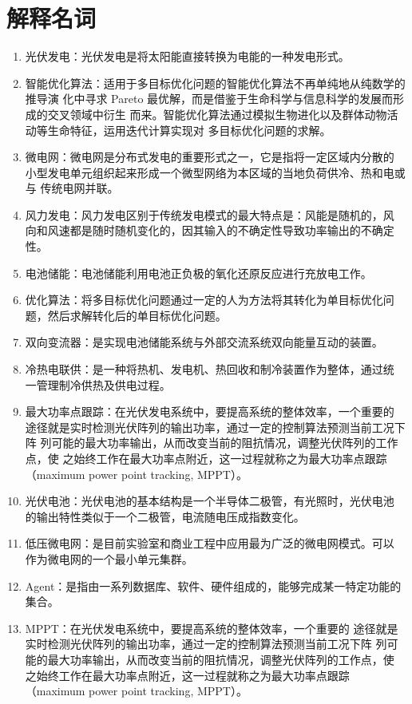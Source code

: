 \documentclass[zihao=-4]{ctexart}
\begin{document}
\section{解释名词}
\begin{enumerate}
\item 光伏发电：光伏发电是将太阳能直接转换为电能的一种发电形式。
\item 智能优化算法：适用于多目标优化问题的智能优化算法不再单纯地从纯数学的推导演
化中寻求 Pareto 最优解，而是借鉴于生命科学与信息科学的发展而形成的交叉领域中衍生
而来。智能优化算法通过模拟生物进化以及群体动物活动等生命特征，运用迭代计算实现对
多目标优化问题的求解。
\item 微电网：微电网是分布式发电的重要形式之一，它是指将一定区域内分散的
小型发电单元组织起来形成一个微型网络为本区域的当地负荷供冷、热和电或与
传统电网并联。
\item 风力发电：风力发电区别于传统发电模式的最大特点是：风能是随机的，风
向和风速都是随时随机变化的，因其输入的不确定性导致功率输出的不确定性。
\item 电池储能：电池储能利用电池正负极的氧化还原反应进行充放电工作。
\item 优化算法：将多目标优化问题通过一定的人为方法将其转化为单目标优化问
题，然后求解转化后的单目标优化问题。
\item 双向变流器：是实现电池储能系统与外部交流系统双向能量互动的装置。
\item 冷热电联供：是一种将热机、发电机、热回收和制冷装置作为整体，通过统
一管理制冷供热及供电过程。
\item 最大功率点跟踪：在光伏发电系统中，要提高系统的整体效率，一个重要的
途径就是实时检测光伏阵列的输出功率，通过一定的控制算法预测当前工况下阵
列可能的最大功率输出，从而改变当前的阻抗情况，调整光伏阵列的工作点，使
之始终工作在最大功率点附近，这一过程就称之为最大功率点跟踪（maximum
power point tracking, MPPT）。
\item 光伏电池：光伏电池的基本结构是一个半导体二极管，有光照时，光伏电池
的输出特性类似于一个二极管，电流随电压成指数变化。
\item 低压微电网：是目前实验室和商业工程中应用最为广泛的微电网模式。可以
作为微电网的一个最小单元集群。
\item Agent：是指由一系列数据库、软件、硬件组成的，能够完成某一特定功能的
集合。
\item MPPT：在光伏发电系统中，要提高系统的整体效率，一个重要的
途径就是实时检测光伏阵列的输出功率，通过一定的控制算法预测当前工况下阵
列可能的最大功率输出，从而改变当前的阻抗情况，调整光伏阵列的工作点，使
之始终工作在最大功率点附近，这一过程就称之为最大功率点跟踪（maximum
power point tracking, MPPT）。
\end{enumerate}
\end{document}
